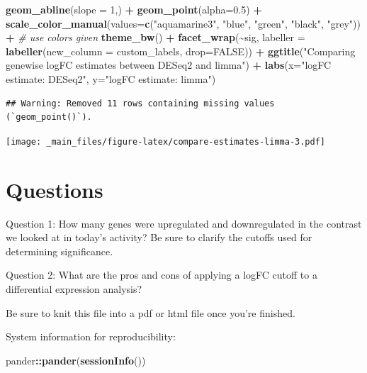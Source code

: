 \documentclass[
]{book}
\newenvironment{Shaded}{\begin{snugshade}}{\end{snugshade}}
\newcommand{\AttributeTok}[1]{\textcolor[rgb]{0.13,0.29,0.53}{#1}}
\newcommand{\CommentTok}[1]{\textcolor[rgb]{0.56,0.35,0.01}{\textit{#1}}}
\newcommand{\ConstantTok}[1]{\textcolor[rgb]{0.56,0.35,0.01}{#1}}
\newcommand{\DecValTok}[1]{\textcolor[rgb]{0.00,0.00,0.81}{#1}}
\newcommand{\FloatTok}[1]{\textcolor[rgb]{0.00,0.00,0.81}{#1}}
\newcommand{\FunctionTok}[1]{\textcolor[rgb]{0.13,0.29,0.53}{\textbf{#1}}}
\newcommand{\NormalTok}[1]{#1}
\newcommand{\SpecialCharTok}[1]{\textcolor[rgb]{0.81,0.36,0.00}{\textbf{#1}}}
\newcommand{\StringTok}[1]{\textcolor[rgb]{0.31,0.60,0.02}{#1}}
\begin{document}
\begin{Shaded}
\begin{Highlighting}[]
  \FunctionTok{geom\_abline}\NormalTok{(}\AttributeTok{slope =} \DecValTok{1}\NormalTok{,) }\SpecialCharTok{+}
  \FunctionTok{geom\_point}\NormalTok{(}\AttributeTok{alpha=}\FloatTok{0.5}\NormalTok{) }\SpecialCharTok{+}
  \FunctionTok{scale\_color\_manual}\NormalTok{(}\AttributeTok{values=}\FunctionTok{c}\NormalTok{(}\StringTok{"aquamarine3"}\NormalTok{, }\StringTok{"blue"}\NormalTok{, }\StringTok{"green"}\NormalTok{, }\StringTok{"black"}\NormalTok{, }\StringTok{"grey"}\NormalTok{)) }\SpecialCharTok{+} \CommentTok{\# use colors given}
  \FunctionTok{theme\_bw}\NormalTok{() }\SpecialCharTok{+}
  \FunctionTok{facet\_wrap}\NormalTok{(}\SpecialCharTok{\textasciitilde{}}\NormalTok{sig, }\AttributeTok{labeller =} \FunctionTok{labeller}\NormalTok{(}\AttributeTok{new\_column =}\NormalTok{ custom\_labels, }\AttributeTok{drop=}\ConstantTok{FALSE}\NormalTok{)) }\SpecialCharTok{+}
  \FunctionTok{ggtitle}\NormalTok{(}\StringTok{"Comparing genewise logFC estimates between DESeq2 and limma"}\NormalTok{) }\SpecialCharTok{+}
  \FunctionTok{labs}\NormalTok{(}\AttributeTok{x=}\StringTok{"logFC estimate: DESeq2"}\NormalTok{, }\AttributeTok{y=}\StringTok{"logFC estimate: limma"}\NormalTok{)}
\end{Highlighting}
\end{Shaded}

\begin{verbatim}
## Warning: Removed 11 rows containing missing values (`geom_point()`).
\end{verbatim}

\texttt{[image: \_main\_files/figure-latex/compare-estimates-limma-3.pdf]}

\hypertarget{questions-5}{%
\section{Questions}\label{questions-5}}

Question 1: How many genes were upregulated and downregulated in the
contrast we looked at in today's activity? Be sure to clarify the
cutoffs used for determining significance.

Question 2: What are the pros and cons of applying a logFC cutoff to a
differential expression analysis?

Be sure to knit this file into a pdf or html file once you're finished.

System information for reproducibility:

\begin{Shaded}
\begin{Highlighting}[]
\NormalTok{pander}\SpecialCharTok{::}\FunctionTok{pander}\NormalTok{(}\FunctionTok{sessionInfo}\NormalTok{())}
\end{Highlighting}
\end{Shaded}
\end{document}
